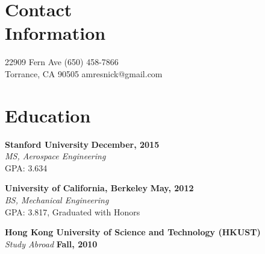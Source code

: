 \documentclass[margin,line]{resume}
\begin{document}
\begin{resume}

    \section{\mysidestyle Contact\\Information}

    22909 Fern Ave						                           \hfill (650) 458-7866\\
    Torrance, CA 90505								\hfill amresnick@gmail.com

    \section{\mysidestyle Education}

    \textbf{Stanford University} \hfill \textbf{December, 2015} \\%
    \textsl{MS, Aerospace Engineering} \\%
    GPA: 3.634

    \textbf{University of California, Berkeley} \hfill \textbf{May, 2012}\\%
    \textsl{BS, Mechanical Engineering} \\%
    GPA: 3.817, Graduated with Honors

    \textbf{Hong Kong University of Science and Technology (HKUST)}\\
    \textsl{Study Abroad} \hfill \textbf{Fall, 2010}\\ \vspace{-5mm}



\end{resume}
\end{document}
